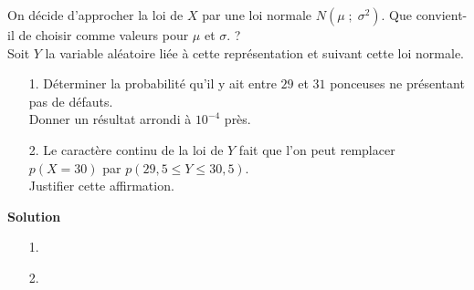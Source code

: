 On décide d'approcher la loi de $X$ par une loi normale $N\left(\mu \; ; \; \sigma^2\right)$. Que convient-il de choisir comme valeurs pour $\mu$ et $\sigma$. ? \\

Soit $Y$ la variable aléatoire liée à cette représentation et suivant cette loi normale. \\

\begin{itemize}
\item[1.] Déterminer la probabilité qu'il y ait entre $29$ et $31$ ponceuses ne présentant pas de défauts. \\ Donner un résultat arrondi à $10^{-4}$ près. \\
\item[2.] Le caractère continu de la loi de $Y$ fait que l'on peut remplacer $p\left(X = 30\right)$ par $p\left(29,5 \leqslant Y \leqslant 30,5\right)$. \\
Justifier cette affirmation.
\end{itemize}

\vspace*{.3cm}

\textbf{Solution} \\

\begin{itemize}
\item[1.]
\item[2.]
\end{itemize}


\ifdefined\COMPLETE
\else
    
\fi